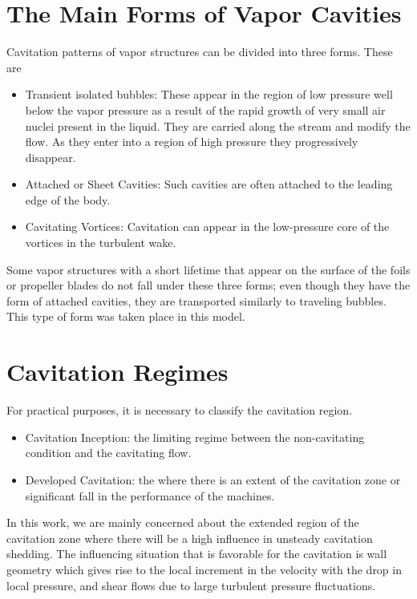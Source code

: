 \section{The Main Forms of Vapor Cavities}
Cavitation patterns of vapor structures can be divided into three forms. These are
\begin{itemize}
\item Transient isolated bubbles: These appear in the region of low pressure well below the vapor pressure as a result of the rapid growth of very small air nuclei present in the liquid. They are carried along the 
stream and modify the flow. As they enter into a region of high pressure they progressively disappear.
\item Attached or Sheet Cavities: Such cavities are often attached to the leading edge of the body.
\item Cavitating Vortices: Cavitation can appear in the low-pressure core of the vortices in the turbulent wake.
\end{itemize}
Some vapor structures with a short lifetime that appear on the surface of the foils or propeller blades do not fall under these three forms; even though they have the form of attached cavities, 
they are transported similarly to traveling bubbles. This type of form was taken place in this model.\\
\section{Cavitation Regimes}
For practical purposes, it is necessary to classify the cavitation region.
\begin{itemize}
\item Cavitation Inception: the limiting regime between the non-cavitating condition and the cavitating flow.
\item Developed Cavitation: the where there is an extent of the cavitation zone or significant fall in the performance of the machines.
\end{itemize}
In this work, we are mainly concerned about the extended region of the cavitation zone where there will be a high influence in unsteady cavitation shedding. The influencing situation that is favorable for the 
cavitation is wall geometry which gives rise to the local increment in the velocity with the drop in local pressure, and shear flows due to large turbulent pressure fluctuations.\\

